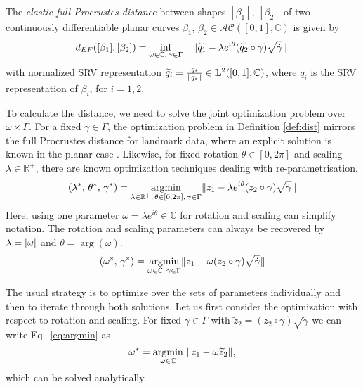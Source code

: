 \begin{definition}
  \label{def:dist}
  The \emph{elastic full Procrustes distance} between shapes $[\beta_1]$, $[\beta_2]$ of two continuously differentiable planar curves $\beta_1$, $\beta_2 \in \mathcal{AC}([0,1],\mathbb{C})$  is given by 
    $$d_{EF}([\beta_1], [\beta_2]) = \inf_{\omega \in \mathbb{C},\, \gamma \in \Gamma} \quad \lVert\widetilde q_1 - \lambda e^{i\theta} (\widetilde q_2 \circ \gamma) \sqrt{\dot\gamma}\rVert\, $$
    with normalized SRV representation $\widetilde q_{i} = \frac{q_{i}}{\lVert q_{i}\rVert} \in \mathbb{L}^2([0,1], \mathbb{C})$, where $q_i$ is the SRV representation of $\beta_i$, for $i = 1,2$.
\end{definition}

\noindent To calculate the distance, we need to solve the joint optimization problem over $\omega \times \Gamma$.
For a fixed $\gamma \in \Gamma$, the optimization problem in Definition \ref{def:dist} mirrors the full Procrustes distance for landmark data, where an explicit solution is known in the planar case \parencite[see][Chapter~8]{DrydenMardia2016}.
Likewise, for fixed rotation $\theta \in [0,2\pi]$ and scaling $\lambda \in \mathbb{R}^+$, there are known optimization techniques dealing with re-parametrisation.
\begin{equation*}
  (\lambda^*,\, \theta^*,\, \gamma^*) = \operatorname*{argmin}_{\lambda \in \mathbb{R}^+,\, \theta \in [0,2\pi],\, \gamma \in \Gamma} \lVert z_1 - \lambda e^{i\theta} (z_2 \circ \gamma) \sqrt{\dot\gamma}\rVert
\end{equation*}
Here, using one parameter $\omega = \lambda e^{i\theta} \in \mathbb{C}$ for rotation and scaling can simplify notation.
The rotation and scaling parameters can always be recovered by $\lambda = \lvert\omega\rvert$ and $\theta = \arg(\omega)$.
\begin{equation}
  \label{eq:argmin}
  (\omega^*,\, \gamma^*) = \operatorname*{argmin}_{\omega \in \mathbb{C},\, \gamma \in \Gamma} \lVert z_1 - \omega (z_2 \circ \gamma) \sqrt{\dot\gamma}\rVert
\end{equation}

The usual strategy is to optimize over the sets of parameters individually and then to iterate through both solutions.
Let us first consider the optimization with respect to rotation and scaling.
For fixed $\gamma \in \Gamma$ with $\widetilde z_2 = (z_2 \circ \gamma) \sqrt{\dot\gamma}$ we can write Eq.\ \ref{eq:argmin} as
\begin{equation}
  \label{eq:argmin_rot}
  \omega^* = \operatorname*{argmin}_{\omega \in \mathbb{C}}\,\, \lVert z_1 - \omega \widetilde z_2\rVert,
\end{equation}
which can be solved analytically.

